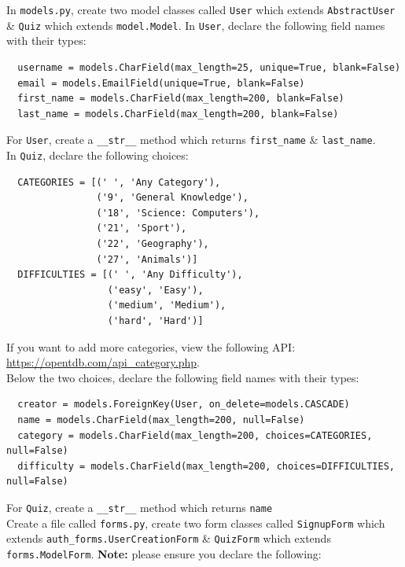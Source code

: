 \documentclass{article}
\begin{document}
In \texttt{models.py}, create two model classes called \texttt{User} which extends \texttt{AbstractUser} \& \texttt{Quiz} which extends \texttt{model.Model}. In \texttt{User}, declare the following field names with their types:
\begin{verbatim}
  username = models.CharField(max_length=25, unique=True, blank=False)
  email = models.EmailField(unique=True, blank=False)
  first_name = models.CharField(max_length=200, blank=False)
  last_name = models.CharField(max_length=200, blank=False)
\end{verbatim}

For \texttt{User}, create a \texttt{\_\_str\_\_} method which returns \texttt{first\_name} \& \texttt{last\_name}. \\

In \texttt{Quiz}, declare the following choices:
\begin{verbatim}
  CATEGORIES = [(' ', 'Any Category'),
                ('9', 'General Knowledge'),
                ('18', 'Science: Computers'),
                ('21', 'Sport'),
                ('22', 'Geography'),
                ('27', 'Animals')]
  DIFFICULTIES = [(' ', 'Any Difficulty'),
                  ('easy', 'Easy'),
                  ('medium', 'Medium'),
                  ('hard', 'Hard')]
\end{verbatim}

If you want to add more categories, view the following API: \href{https://opentdb.com/api\_category.php}{https://opentdb.com/api\_category.php}. \\

Below the two choices, declare the following field names with their types:

\begin{verbatim}
  creator = models.ForeignKey(User, on_delete=models.CASCADE)
  name = models.CharField(max_length=200, null=False)
  category = models.CharField(max_length=200, choices=CATEGORIES, null=False)
  difficulty = models.CharField(max_length=200, choices=DIFFICULTIES, null=False)
\end{verbatim}

For \texttt{Quiz}, create a \texttt{\_\_str\_\_} method which returns \texttt{name} \\

Create a file called \texttt{forms.py}, create two form classes called \texttt{SignupForm} which extends \texttt{auth\_forms.UserCreationForm} \& \texttt{QuizForm} which extends \texttt{forms.ModelForm}. \textbf{Note:} please ensure you declare the following:
\end{document}
